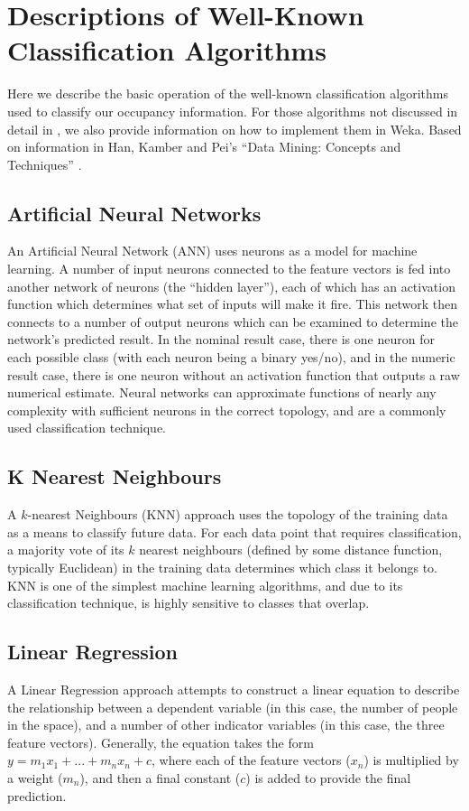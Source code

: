 \chapter{Descriptions of Well-Known Classification Algorithms}
\label{chap:appendix:classification}
Here we describe the basic operation of the well-known classification algorithms used to classify our occupancy information. For those algorithms not discussed in detail in , we also provide information on how to implement them in Weka. Based on information in Han, Kamber and Pei's ``Data Mining: Concepts and Techniques'' \cite{han2011data}.

\section{Artificial Neural Networks}
An Artificial Neural Network (ANN) uses neurons as a model for machine learning. A number of input neurons connected to the feature vectors is fed into another network of neurons (the ``hidden layer''), each of which has an activation function which determines what set of inputs will make it fire. This network then connects to a number of output neurons which can be examined to determine the network's predicted result. In the nominal result case, there is one neuron for each possible class (with each neuron being a binary yes/no), and in the numeric result case, there is one neuron without an activation function that outputs a raw numerical estimate. Neural networks can approximate functions of nearly any complexity with sufficient neurons in the correct topology, and are a commonly used classification technique.

\section{K Nearest Neighbours}
A $k$-nearest Neighbours (KNN) approach uses the topology of the training data as a means to classify future data. For each data point that requires classification, a majority vote of its $k$ nearest neighbours (defined by some distance function, typically Euclidean) in the training data determines which class it belongs to. KNN is one of the simplest machine learning algorithms, and due to its classification technique, is highly sensitive to classes that overlap. 

\section{Linear Regression}
A Linear Regression approach attempts to construct a linear equation to describe the relationship between a dependent variable (in this case, the number of people in the space), and a number of other indicator variables (in this case, the three feature vectors). Generally, the equation takes the form $y = m_1x_1 + ... + m_nx_n + c$, where each of the feature vectors ($x_n$) is multiplied by a weight ($m_n$), and then a final constant ($c$) is added to provide the final prediction.

